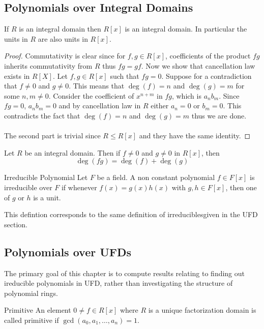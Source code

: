 \documentclass[a4paper]{article}
\begin{document}
\subsection{Polynomials over Integral Domains}
\begin{prp}{}{} If $R$ is an integral domain then $R[x]$ is an integral domain. In particular the units in $R$ are also units in $R[x]$. \tcbline
\begin{proof}
Commutativity is clear since for $f,g\in R[x]$, coefficients of the product $fg$ inherits commutativity from $R$ thus $fg=gf$. Now we show that cancellation law exists in $R[X]$. Let $f,g\in R[x]$ such that $fg=0$. Suppose for a contradiction that $f\neq 0$ and $g\neq 0$. This means that $\deg(f)=n$ and $\deg(g)=m$ for some $n,m\neq 0$. Consider the coefficient of $x^{n+m}$ in $fg$, which is $a_nb_m$. Since $fg=0$, $a_nb_m=0$ and by cancellation law in $R$ either $a_n=0$ or $b_m=0$. This contradicts the fact that $\deg(f)=n$ and $\deg(g)=m$ thus we are done. \\~\\
The second part is trivial since $R\leq R[x]$ and they have the same identity. 
\end{proof}
\end{prp}

\begin{prp}{}{} Let $R$ be an integral domain. Then if $f\neq 0$ and $g\neq 0$ in $R[x]$, then $$\deg(fg)=\deg(f)+\deg(g)$$
\end{prp}

\begin{defn}{Irreducible Polynomial}{} Let $F$ be a field. A non constant polynomial $f\in F[x]$ is irreducible over $F$ if whenever $f(x)=g(x)h(x)$ with $g,h\in F[x]$, then one of $g$ or $h$ is a unit. 
\end{defn}

This defintion corresponds to the same definition of irreduciblesgiven in the UFD section. 

\subsection{Polynomials over UFDs}
The primary goal of this chapter is to compute results relating to finding out ireducible polynomials in UFD, rather than investigating the structure of polynomial rings. 
\begin{defn}{Primitive}{} An element $0\neq f\in R[x]$ where $R$ is a unique factorization domain is called primitive if $\gcd(a_0,a_1,\dots,a_n)=1$. 
\end{defn}
\end{document}
